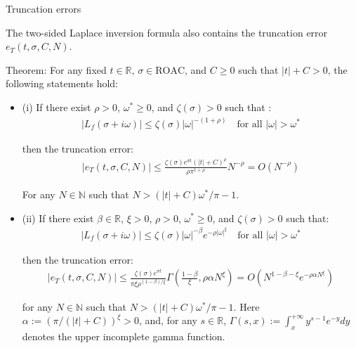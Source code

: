 \documentclass{beamer}
\begin{document}
\begin{frame}{Truncation errors}


    {\footnotesize \scriptsize
    \par The two-sided Laplace inversion formula also contains the truncation error \( e_T(t, \sigma, C, N) \). 
    \par Theorem: For any fixed \( t \in \mathbb{R} \), \( \sigma \in \text{ROAC} \), 
    and \( C \geq 0 \) such that \( |t| + C > 0 \), the following statements hold:
    \begin{itemize}
        \item (i) If there exist \( \rho > 0 \), \( \omega^* \geq 0 \), and \( \zeta(\sigma) > 0 \) such that :
        \begin{align*}
            |L_f(\sigma + i\omega)| \leq \zeta(\sigma)|\omega|^{-(1+\rho)} \quad \text{for all } |\omega| > \omega^*
        \end{align*}
        \par then the truncation error:
        \begin{align*}
            |e_T(t, \sigma, C, N)| \leq \frac{\zeta(\sigma)e^{\sigma t}(|t| + C)^\rho}{\rho\pi^{1+\rho}}N^{-\rho} = O(N^{-\rho})
        \end{align*}
        \par For any \( N \in \mathbb{N} \) such that \( N > (|t| + C)\omega^*/ \pi - 1 \).
        \item  \pause (ii) If there exist \(\beta \in \mathbb{R}\), \(\xi > 0\), \(\rho > 0\), \(\omega^* \geq 0\), and \(\zeta(\sigma) > 0\) such that:
        \begin{align*}
            |L_f(\sigma + i\omega)| \leq \zeta(\sigma)|\omega|^{-\beta}e^{-\rho|\omega|^\xi} \quad \text{for all } |\omega| > \omega^*
        \end{align*}
        \par then the truncation error:
        \begin{align*}
            |e_T(t, \sigma, C, N)| \leq \frac{\zeta(\sigma)e^{\sigma t}}{\pi \xi \rho^{(1 - \beta)/\xi}} 
            \Gamma\left( \frac{1 - \beta}{\xi}, \rho \alpha N^\xi \right) = O(N^{1 - \beta - \xi} e^{-\rho \alpha N^\xi})
        \end{align*}
        \par for any \(N \in \mathbb{N}\) such that \(N > (|t| + C)\omega^*/ \pi - 1\). Here \(\alpha := (\pi / (|t| + C))^\xi > 0\), and,
         for any \(s \in \mathbb{R}\), \(\Gamma(s, x) := \int_x^{+\infty} y^{s-1} e^{-y}  dy\) denotes the upper incomplete gamma function.
    \end{itemize}
    }
    
\end{frame}
\end{document}
